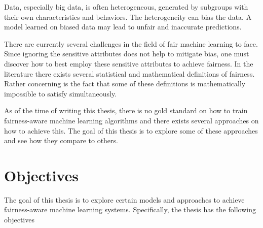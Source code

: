 Data, especially big data, is often heterogeneous, generated by subgroups with their own characteristics and behaviors. The heterogeneity can bias the data. A model learned on biased data may lead to unfair and inaccurate predictions.

There are currently several challenges in the field of fair machine learning to face. Since ignoring the sensitive attributes does not help to mitigate bias, one must discover how to best employ these sensitive attributes to achieve fairness. In the literature there exists several statistical and mathematical definitions of fairness. Rather concerning is the fact that some of these definitions is mathematically impossible to satisfy simultaneously. \cite{Kleinberg:2017:LIPIcs}

As of the time of writing this thesis, there is no gold standard on how to train fairness-aware machine learning algorithms and there exists several approaches on how to achieve this. \cite{Mehrabi:2021:CSUR} The goal of this thesis is to explore some of these approaches and see how they compare to others. 


\section{Objectives}
\label{sec:intro:objectives}

The goal of this thesis is to explore certain models and approaches to achieve fairness-aware machine learning systems. Specifically, the thesis has the following objectives

